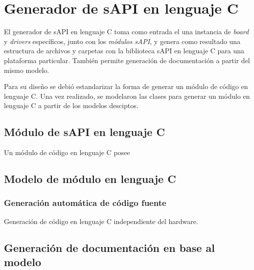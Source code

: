 \section{Generador de sAPI en lenguaje C}
\label{sec:modelGenerator}

El generador de sAPI en lenguaje C toma como entrada el una instancia de \emph{board} y \emph{drivers} específicos, junto con los \emph{módulos sAPI}, y genera como resultado una estructura de archivos y carpetas con la biblioteca sAPI en lenguaje C para una plataforma particular. También permite generación de documentación a partir del mismo modelo.

Para su diseño se debió estandarizar la forma de generar un módulo de código en lenguaje C.
Una vez realizado, se modelaron las clases para generar un módulo en lenguaje C a partir de los modelos desciptos.

\subsection{Módulo de sAPI en lenguaje C}
\label{sec:moduloEnC}

Un módulo de código en lenguaje C posee 

\subsection{Modelo de módulo en lenguaje C}
\label{sec:modelModuloEnC}

\subsubsection{Generación automática de código fuente}
\label{sec:genCIndep}

Generación de código en lenguaje C independiente del hardware.


\subsection{Generación de documentación en base al modelo}
\label{sec:genDoc}



